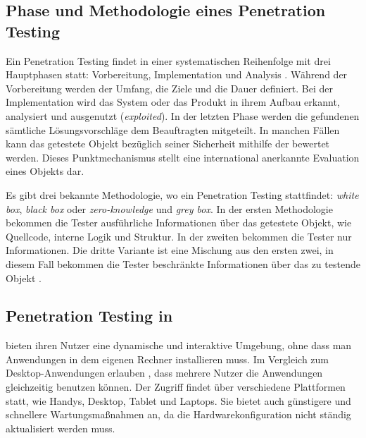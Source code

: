 \subsection{Phase und Methodologie eines Penetration Testing}

Ein Penetration Testing findet in einer systematischen Reihenfolge mit drei Hauptphasen statt: Vorbereitung, Implementation und Analysis \citep{Hessa_study_pentesting}. Während der Vorbereitung werden der Umfang, die Ziele und die Dauer definiert. Bei der Implementation wird das System oder das Produkt in ihrem Aufbau erkannt, analysiert und ausgenutzt (\textit{exploited}). In der letzten Phase werden die gefundenen  sämtliche Lösungsvorschläge dem Beauftragten mitgeteilt. In manchen Fällen kann das getestete Objekt bezüglich seiner Sicherheit mithilfe der  bewertet werden. Dieses Punktmechanismus stellt eine international anerkannte Evaluation eines Objekts dar. 

Es gibt drei bekannte Methodologie, wo ein Penetration Testing stattfindet: \textit{white box}, \textit{black box} oder \textit{zero-knowledge} und \textit{grey box}. In der ersten Methodologie bekommen die Tester ausführliche Informationen über das getestete Objekt, wie Quellcode, interne Logik und Struktur. In der zweiten bekommen die Tester nur  Informationen. Die dritte Variante ist eine Mischung aus den ersten zwei, in diesem Fall bekommen die Tester beschränkte Informationen über das zu testende Objekt \citep{Ehmer_methoden_testen}.




\subsection{Penetration Testing in }

 bieten ihren Nutzer eine dynamische und interaktive Umgebung, ohne dass man Anwendungen in dem eigenen Rechner installieren muss. Im Vergleich zum Desktop-Anwendungen erlauben , dass mehrere Nutzer die Anwendungen gleichzeitig benutzen können. Der  Zugriff findet über verschiedene Plattformen statt, wie Handys, Desktop, Tablet und Laptops. Sie bietet auch günstigere und schnellere Wartungsmaßnahmen an, da die Hardwarekonfiguration nicht ständig aktualisiert werden muss\citep{webapp}. 

